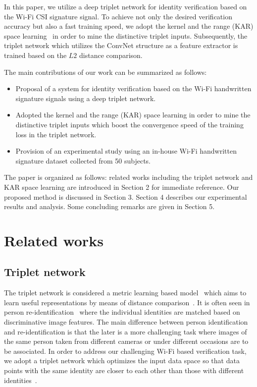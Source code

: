 \documentclass[sigconf]{acmart}
\begin{document}
In this paper, we utilize a deep triplet network for identity verification based on the Wi-Fi CSI signature signal. To achieve not only the desired verification accuracy but also a fast training speed, we adopt the kernel and the range (KAR) space learning~\cite{toh100,toh2018learning,toh2018analytic,toh2018gradient} in order to mine the distinctive triplet inputs. Subsequently, the triplet network which utilizes the ConvNet structure as a feature extractor is trained based on the $L2$ distance comparison.

The main contributions of our work can be summarized as follows:
\begin{itemize}
\item Proposal of a system for identity verification based on the Wi-Fi handwritten signature signals using a deep triplet network.
\item Adopted the kernel and the range (KAR) space learning in order to mine the distinctive triplet inputs which boost the convergence speed of the training loss in the triplet network.
\item Provision of an experimental study using an in-house Wi-Fi handwritten signature dataset collected from 50 subjects.
\end{itemize}

The paper is organized as follows: related works including the triplet network and KAR space learning are introduced in Section 2 for immediate reference. Our proposed method is discussed in Section 3. Section 4 describes our experimental results and analysis. Some concluding remarks are given in Section 5.

\section{Related works}

\subsection{Triplet network}
The triplet network is considered a metric learning based model~\cite{weinberger2006distance} which aims to learn useful representations by means of distance comparison~\cite{hoffer2015deep}. 
It is often seen in person re-identification~\cite{chen2017beyond,cheng2016person,ding2015deep,schroff2015facenet,wang2016joint} where the individual identities are matched based on discriminative image features. The main difference between person identification and re-identification is that the later is a more challenging task where images of the same person taken from different cameras or under different occasions are to be associated. In order to address our challenging Wi-Fi based verification task, we adopt a triplet network which optimizes the input data space so that data points with the same identity are closer to each other than those with different identities~\cite{hermans2017defense}.
\end{document}
